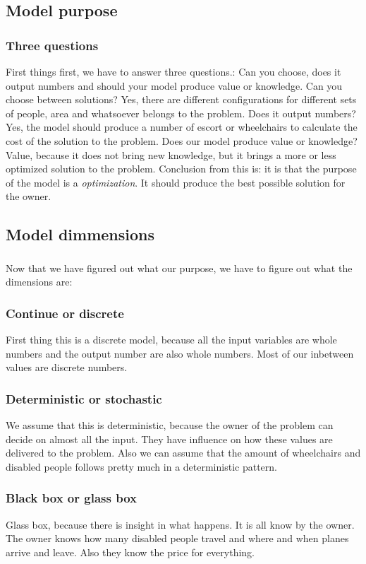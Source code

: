 \documentclass[a4paper, 12pt, notitlepage]{report}
\begin{document}
\subsection{Model purpose}
\subsubsection{Three questions}
First things first, we have to answer three questions.:
Can you choose, does it output numbers and should your model produce value or knowledge.
Can you choose between solutions? Yes, there are different configurations for different sets of people, area and whatsoever belongs to the problem.
Does it output numbers? Yes, the model should produce a number of escort or wheelchairs to calculate the cost of the solution to the problem.
Does our model produce value or knowledge? Value, because it does not bring new knowledge, but it brings a more or less optimized solution to the problem.
Conclusion from this is: it is that the purpose of the model is a \textit{optimization}. It should produce the best possible solution for the owner.

\subsection{Model dimmensions}
\subsubsection{}
Now that we have figured out what our purpose, we have to figure out what the dimensions are:
\subsubsection{Continue or discrete}
First thing this is a discrete model, because all the input variables are whole numbers and the output number are also whole numbers. Most of our inbetween values are discrete numbers.
\subsubsection{Deterministic or stochastic}
We assume that this is deterministic, because the owner of the problem can decide on almost all the input. They have influence on how these values are delivered to the problem. Also we can assume that the amount of wheelchairs and disabled people follows pretty much in a deterministic pattern.
\subsubsection{Black box or glass box}
Glass box, because there is insight in what happens. It is all know by the owner.  The owner knows how many disabled people travel and where and when planes arrive and leave. Also they know the price for everything.
\end{document}

